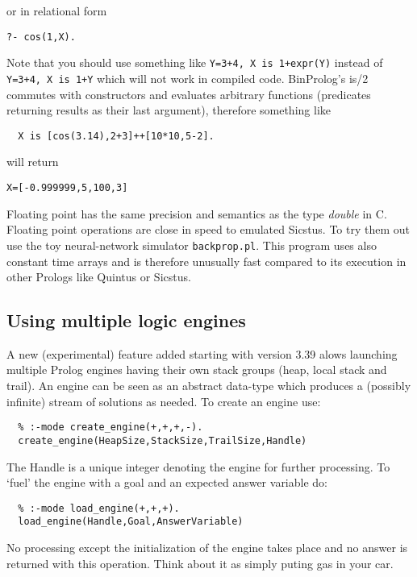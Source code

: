 \documentclass{article}
\begin{document}
or in relational form

\begin{verbatim}
?- cos(1,X).
\end{verbatim}

Note that you should use something like {\tt Y=3+4, X is 1+expr(Y)}
instead of {\tt Y=3+4, X is 1+Y} which will not work in compiled code.
BinProlog's is/2 commutes with constructors and evaluates arbitrary
functions (predicates returning results as their last argument), 
therefore something like 

\begin{verbatim}
  X is [cos(3.14),2+3]++[10*10,5-2].
\end{verbatim}

will return 
\begin{verbatim}
X=[-0.999999,5,100,3]
\end{verbatim}

Floating point has the same precision and semantics
as the type {\em double} in C.
Floating point operations are close in speed to emulated Sicstus.
To try them out use the toy neural-network simulator {\tt backprop.pl}.
This program uses also constant time arrays and is therefore
unusually fast compared to its execution in other Prologs like
Quintus or Sicstus.

\subsection{Using multiple logic engines}

A new (experimental) feature added starting with version 3.39 alows launching
multiple Prolog engines having their own stack groups (heap, local stack
and trail). An engine can be seen as an abstract data-type which
produces a (possibly infinite) stream of solutions as needed.
To create an engine use:

\begin{verbatim}
  % :-mode create_engine(+,+,+,-).
  create_engine(HeapSize,StackSize,TrailSize,Handle)
\end{verbatim}

The Handle is a unique integer denoting the engine for further
processing.
To `fuel' the engine with a goal and an expected answer variable
do:

\begin{verbatim}
  % :-mode load_engine(+,+,+).
  load_engine(Handle,Goal,AnswerVariable)
\end{verbatim}

No processing except the initialization of the
engine takes place and no answer
is returned with this operation. Think about it as simply puting
gas in your car.
\end{document}
